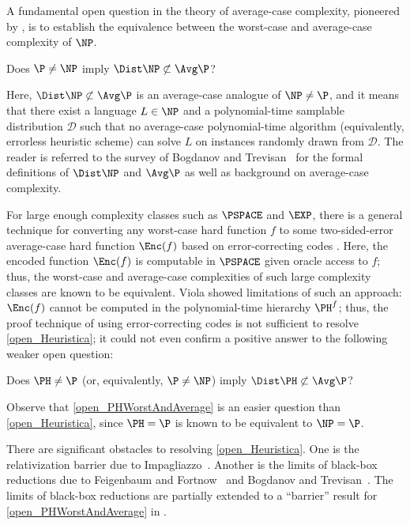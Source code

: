 \documentclass{toc}
\begin{document}
A fundamental open question in the theory of average-case complexity, pioneered by \cite{Levin86_siamcomp_journals}, is
to establish the equivalence between the worst-case and average-case complexity of $\NP$.
\begin{open}
  \label{open_Heuristica}
  Does $\P \neq \NP$ imply $\Dist\NP \not\subset \Avg\P$?
\end{open}
Here, $\Dist\NP \not\subset \Avg\P$ is an average-case analogue of $\NP \neq \P$,
and it means that there exist a language $L \in \NP$ and a polynomial-time samplable distribution $\mathcal{D}$
such that no average-case polynomial-time algorithm (equivalently, errorless heuristic scheme) can solve $L$ on instances randomly drawn from $\mathcal{D}$.
%
%
%
The reader is referred to the survey of Bogdanov and Trevisan~\cite{BogdanovT06_siamcomp_journals} for the formal definitions of $\Dist\NP$ and $\Avg\P$
as well as background on average-case complexity.

For large enough complexity classes such as $\PSPACE$ and $\EXP$,
there is a general technique for converting any worst-case hard function $f$ to some two-sided-error average-case hard function $\Enc(f)$ based on error-correcting codes \cite{SudanTV01_jcss_journals, TrevisanV07_cc_journals}.
Here, the encoded function $\Enc(f)$ is computable in $\PSPACE$ given oracle access to $f$; thus, the worst-case and average-case
%
complexities  %
of such large complexity classes are known to be equivalent.
%
%
Viola \cite{Viola05_cc_journals} showed limitations of such an approach:
%
%
$\Enc(f)$ cannot be computed in
the polynomial-time hierarchy $\PH^f$; thus, the proof technique of using error-correcting codes is not sufficient to resolve \cref{open_Heuristica};
%
%
%
%
%
%
it could not even confirm a positive answer to  %
the following weaker open question:

\begin{open}
  \label{open_PHWorstAndAverage}
  Does $\PH \neq \P$ (or, equivalently, $\P \neq \NP$)
  imply
  $\Dist\PH \not\subset \Avg\P$?
\end{open}
Observe that \cref{open_PHWorstAndAverage} is an easier question than \cref{open_Heuristica}, since $\PH = \P$ is known to be equivalent to $\NP = \P$.

There are significant obstacles %
to  %
resolving  %
%
\cref{open_Heuristica}.
One is the relativization barrier due to Impagliazzo~\cite{Impagliazzo11_coco_conf}.  Another is the limits of black-box reductions
due to Feigenbaum and Fortnow~\cite{FeigenbaumF93_siamcomp_journals} and Bogdanov and Trevisan~\cite{BogdanovT06_siamcomp_journals}.
The limits of black-box reductions are partially extended to a ``barrier'' result
for \cref{open_PHWorstAndAverage}
in \cite{HiraharaW20_approx_conf}.
\end{document}
